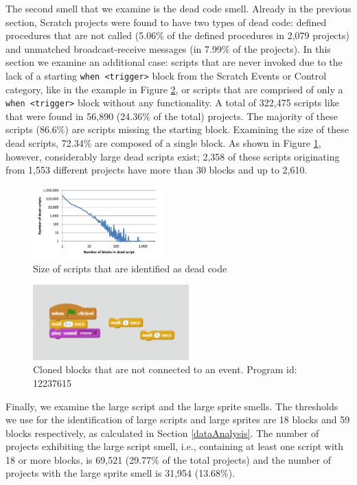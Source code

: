 \documentclass{sig-alternate}
\begin{document}
The second smell that we examine is the dead code smell. Already in the previous section, Scratch projects were found to have two types of dead code: defined procedures that are not called (5.06\% of the defined procedures in 2,079 projects) and unmatched broadcast-receive messages (in 7.99\% of the projects). In this section we examine an additional case: scripts that are never invoked due to the lack of a starting \texttt{when <trigger>} block from the Scratch Events or Control category, like in the example in Figure \ref{fig:Unconnected_clones}, or scripts that are comprised of only a \texttt{when <trigger>} block without any functionality. A total of 322,475 scripts like that were found in 56,890 (24.36\% of the total) projects. The majority of these scripts (86.6\%) are scripts missing the starting block. Examining the size of these dead scripts, 72.34\% are composed of a single block. As shown in Figure \ref{fig:deadcode}, however, considerably large dead scripts exist; 2,358 of these scripts originating from 1,553 different projects have more than 30 blocks and up to 2,610.\footnotemark[\ref{repo}]

\begin{figure}
	\centering
	\includegraphics[width=0.45\textwidth]{fig/charts/12deadcode}
	\caption{Size of scripts that are identified as dead code}
	\label{fig:deadcode}
\end{figure}

\begin{figure}
	\begin{center}
		\includegraphics[width=6cm]{fig/Unconnected_clones.png}
		\caption{Cloned blocks that are not connected to an event. Program id: 12237615}
		\label{fig:Unconnected_clones}
	\end{center}
\end{figure} 

Finally, we examine the large script and the large sprite smells. The thresholds we use for the identification of large scripts and large sprites are 18 blocks and 59 blocks respectively, as calculated in Section \ref{dataAnalysis}. The number of projects exhibiting the large script smell, i.e., containing at least one script with 18 or more blocks, is 69,521 (29.77\% of the total projects) and the number of projects with the large sprite smell is 31,954 (13.68\%).
\end{document}
